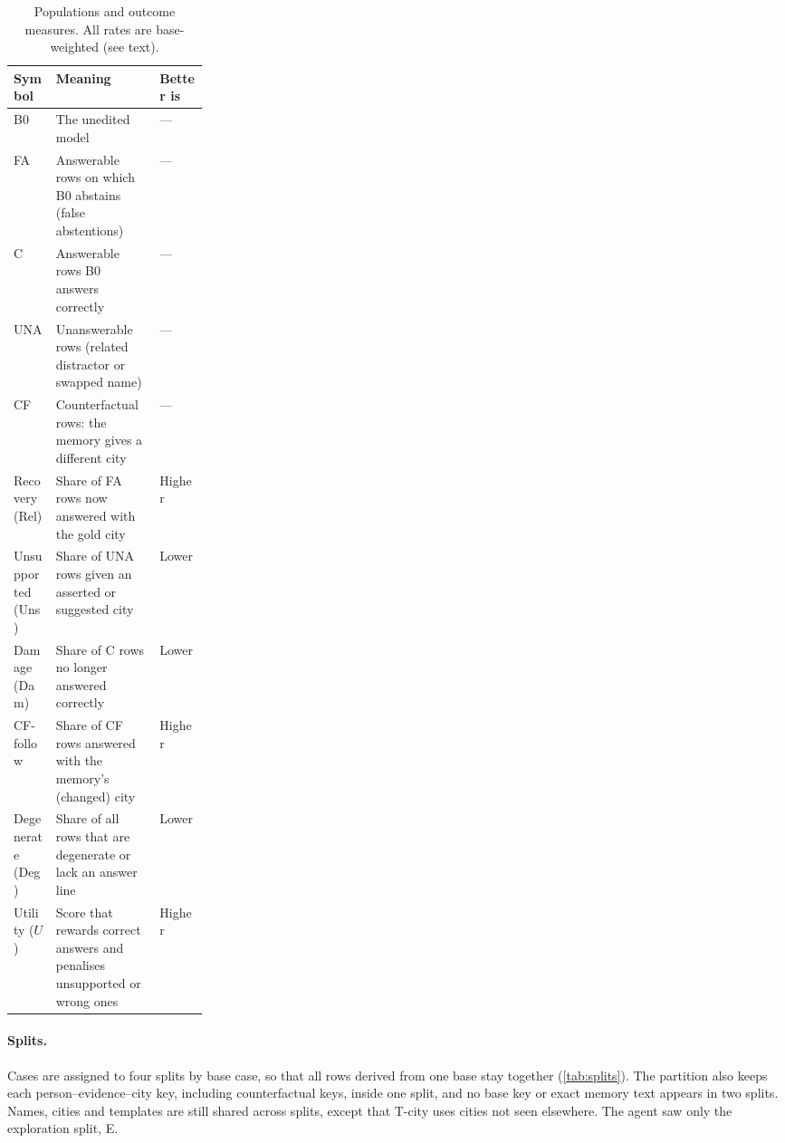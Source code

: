 \begin{table}[t]
\centering\small
\caption{Populations and outcome measures. All rates are base-weighted (see text).}
\label{tab:notation}
\begin{tabularx}{\linewidth}{@{}lYL{0.25\linewidth}@{}}
\toprule
Symbol & Meaning & Better is \\
\midrule
B0 & The unedited model & --- \\
FA & Answerable rows on which B0 abstains (false abstentions) & --- \\
C & Answerable rows B0 answers correctly & --- \\
UNA & Unanswerable rows (related distractor or swapped name) & --- \\
CF & Counterfactual rows: the memory gives a different city & --- \\
\midrule
Recovery (Rel) & Share of FA rows now answered with the gold city & Higher \\
Unsupported (Uns) & Share of UNA rows given an asserted or suggested city & Lower \\
Damage (Dam) & Share of C rows no longer answered correctly & Lower \\
CF-follow & Share of CF rows answered with the memory's (changed) city & Higher \\
Degenerate (Deg) & Share of all rows that are degenerate or lack an answer line & Lower \\
Utility ($U$) & Score that rewards correct answers and penalises unsupported or wrong ones & Higher \\
\bottomrule
\end{tabularx}
\end{table}

\paragraph{Splits.}
Cases are assigned to four splits by base case, so that all rows derived from one base stay together
(\cref{tab:splits}). The partition also keeps each person--evidence--city key, including counterfactual keys, inside
one split, and no base key or exact memory text appears in two splits. Names, cities and templates are still shared
across splits, except that T-city uses cities not seen elsewhere. The agent saw only the exploration split, E.

